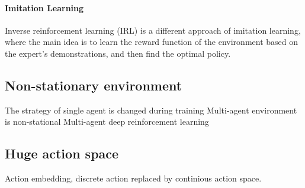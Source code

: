 \paragraph{Imitation Learning\parencite{DBLP:journals/corr/HesterVPLSPSDOA17}} Inverse reinforcement learning (IRL) is a different approach of imitation learning, where the main idea is to learn the reward function of the environment based on the expert’s demonstrations, and then find the optimal policy.

\subsection{Non-stationary environment}
The strategy of single agent is changed during training
Multi-agent environment is non-stational
Multi-agent deep reinforcement learning 

\subsection{Huge action space}
Action embedding, discrete action replaced by continious action space. 